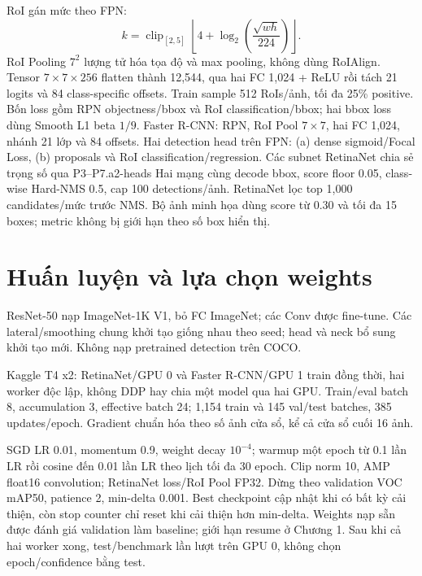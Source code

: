 RoI gán mức theo FPN:
\begin{equation}
k=\operatorname{clip}_{[2,5]}
\left\lfloor4+\log_2\left(\frac{\sqrt{wh}}{224}\right)\right\rfloor.
\end{equation}
RoI Pooling $7^2$ lượng tử hóa tọa độ và max pooling, không dùng RoIAlign.
Tensor $7\times7\times256$ flatten thành 12,544, qua hai FC 1,024 + ReLU
rồi tách 21 logits và 84 class-specific offsets. Train sample 512 RoIs/ảnh,
tối đa 25\% positive. Bốn loss gồm RPN objectness/bbox và RoI classification/bbox;
hai bbox loss dùng Smooth L1 beta $1/9$.
{\ArchFasterHead}{Faster R-CNN: RPN, RoI Pool $7\times7$, hai FC 1,024, nhánh 21 lớp và 84 offsets.}
{Hai detection head trên FPN: (a) dense sigmoid/Focal Loss, (b) proposals và RoI classification/regression. Các subnet RetinaNet chia sẻ trọng số qua P3--P7.}{a2-heads}
Hai mạng cùng decode bbox, score floor 0.05, class-wise Hard-NMS 0.5,
cap 100 detections/ảnh. RetinaNet lọc top 1,000 candidates/mức trước NMS.
Bộ ảnh minh họa dùng score từ 0.30 và tối đa 15 boxes; metric không bị giới hạn
theo số box hiển thị.

\section{Huấn luyện và lựa chọn weights}
ResNet-50 nạp ImageNet-1K V1, bỏ FC ImageNet; các Conv được fine-tune.
Các lateral/smoothing chung khởi tạo giống nhau theo seed; head và neck
bổ sung khởi tạo mới. Không nạp pretrained detection trên COCO.

Kaggle T4 x2: RetinaNet/GPU 0 và Faster R-CNN/GPU 1 train đồng thời,
hai worker độc lập, không DDP hay chia một model qua hai GPU. Train/eval batch 8,
accumulation 3, effective batch 24; 1,154 train và 145 val/test batches,
385 updates/epoch. Gradient chuẩn hóa theo số ảnh cửa sổ, kể cả cửa sổ cuối 16 ảnh.

SGD LR 0.01, momentum 0.9, weight decay $10^{-4}$; warmup một epoch
từ 0.1 lần LR rồi cosine đến 0.01 lần LR theo lịch tối đa 30 epoch.
Clip norm 10, AMP float16 convolution; RetinaNet loss/RoI Pool FP32.
Dừng theo validation VOC mAP50, patience 2, min-delta 0.001. Best checkpoint
cập nhật khi có bất kỳ cải thiện, còn stop counter chỉ reset khi cải thiện
hơn min-delta. Weights nạp sẵn được đánh giá validation làm baseline;
giới hạn resume ở Chương 1. Sau khi cả hai worker xong, test/benchmark
lần lượt trên GPU 0, không chọn epoch/confidence bằng test.

